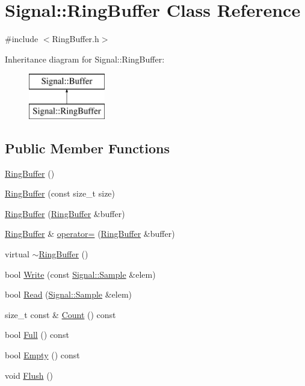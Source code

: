 \hypertarget{class_signal_1_1_ring_buffer}{\section{Signal\+:\+:Ring\+Buffer Class Reference}
\label{class_signal_1_1_ring_buffer}
}


{\ttfamily \#include $<$Ring\+Buffer.\+h$>$}

Inheritance diagram for Signal\+:\+:Ring\+Buffer\+:\begin{figure}[H]
\begin{center}
\leavevmode
\includegraphics[height=2.000000cm]{class_signal_1_1_ring_buffer}
\end{center}
\end{figure}
\subsection*{Public Member Functions}
\begin{DoxyCompactItemize}
\item 
\hyperlink{class_signal_1_1_ring_buffer_a66b2a49fc1ea8d4e2d529362452a9e5e}{Ring\+Buffer} ()
\item 
\hyperlink{class_signal_1_1_ring_buffer_aab0efff6a85c76ce9063b6a7dcc1fe97}{Ring\+Buffer} (const size\+\_\+t size)
\item 
\hyperlink{class_signal_1_1_ring_buffer_a9823e69bede828ca41cdf0b8372224f7}{Ring\+Buffer} (\hyperlink{class_signal_1_1_ring_buffer}{Ring\+Buffer} \&buffer)
\item 
\hyperlink{class_signal_1_1_ring_buffer}{Ring\+Buffer} \& \hyperlink{class_signal_1_1_ring_buffer_a2bc19d3eb407be62e36ac327bffe4b2f}{operator=} (\hyperlink{class_signal_1_1_ring_buffer}{Ring\+Buffer} \&buffer)
\item 
virtual \hyperlink{class_signal_1_1_ring_buffer_aff2a78175f358585ddf207f470062d3e}{$\sim$\+Ring\+Buffer} ()
\item 
bool \hyperlink{class_signal_1_1_ring_buffer_aa291195b777aa50aa7a61ab1f4954bce}{Write} (const \hyperlink{class_signal_1_1_sample}{Signal\+::\+Sample} \&elem)
\item 
bool \hyperlink{class_signal_1_1_ring_buffer_a9a5c8429c0e422e3d4763adb78b0a87c}{Read} (\hyperlink{class_signal_1_1_sample}{Signal\+::\+Sample} \&elem)
\item 
size\+\_\+t const \& \hyperlink{class_signal_1_1_ring_buffer_acf6e81f09bb9f10a79ced6da84e78e20}{Count} () const 
\item 
bool \hyperlink{class_signal_1_1_ring_buffer_ac8124016cfc0c833a3565c87d5f6f1e5}{Full} () const 
\item 
bool \hyperlink{class_signal_1_1_ring_buffer_a73416d725604567d4b496f9821bc0c04}{Empty} () const 
\item 
void \hyperlink{class_signal_1_1_ring_buffer_aa9d2938e5c11c5d3c058db9b7e310406}{Flush} ()
\end{DoxyCompactItemize}
